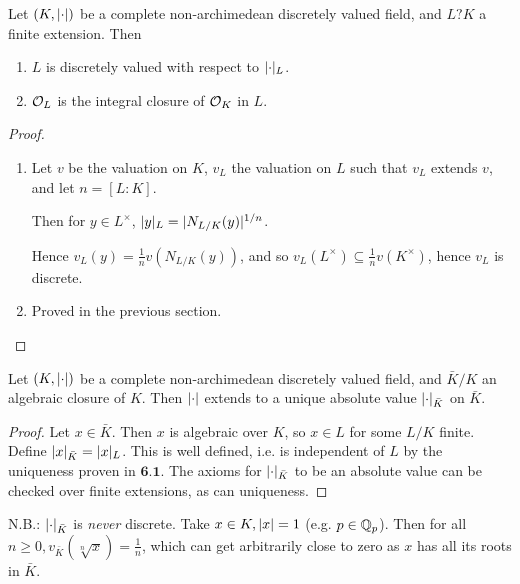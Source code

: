 \documentclass[10pt,a4paper]{article}
\begin{document}
\begin{corollary}
  Let $(K, \lvert\cdot\rvert)$ be a complete non-archimedean discretely valued field, and $L?K$ a finite extension. Then
  \begin{enumerate}
    \item $L$ is discretely valued with respect to $\lvert\cdot\rvert_L$.
    \item $\mathcal{O}_L$ is the integral closure of $\mathcal{O}_K$ in $L$.
  \end{enumerate}
\end{corollary}
\begin{proof}\hspace*{0cm}
  \begin{enumerate}[label=\textit{\arabic*.}]
    \item Let $v$ be the valuation on $K$, $v_L$ the valuation on $L$ such that $v_L$ extends $v$, and let $n = [L:K]$.

    Then for $y \in L^\times$, $\lvert y\rvert_L = \lvert N_{L/K}(y)\rvert^{1/n}$.

    Hence $v_L(y) = \frac{1}{n}v(N_{L/K}(y))$, and so $v_L(L^\times) \subseteq \frac{1}{n}v(K^\times)$, hence $v_L$ is discrete.

    \item Proved in the previous section.
\end{enumerate}
\end{proof}
\begin{corollary}
  Let $(K, \lvert\cdot\rvert)$ be a complete non-archimedean discretely valued field, and $\bar{K}/K$ an algebraic closure of $K$. Then $\lvert\cdot\rvert$ extends to a unique absolute value $\lvert\cdot\rvert_{\bar{K}}$ on $\bar{K}$.
\end{corollary}
\begin{proof}
  Let $x \in \bar{K}$. Then $x$ is algebraic over $K$, so $x \in L$ for some $L/K$ finite. Define $\lvert x\rvert_{\bar{K}} = \lvert x\rvert_L$. This is well defined, i.e. is independent of $L$ by the uniqueness proven in $\textbf{6.1}$. The axioms for $\lvert\cdot\rvert_{\bar{K}}$ to be an absolute value can be checked over finite extensions, as can uniqueness.
\end{proof}
\textsc{N.B.:} $\lvert\cdot\rvert_{\bar{K}}$ is \textit{never} discrete. Take $x \in K, \lvert x\rvert = 1$ (e.g. $p \in \mathbb{Q}_p$). Then for all $n \geq 0, v_{\bar{K}}(\sqrt[n]{x}) = \frac{1}{n}$, which can get arbitrarily close to zero as $x$ has all its roots in $\bar{K}$.
\end{document}
